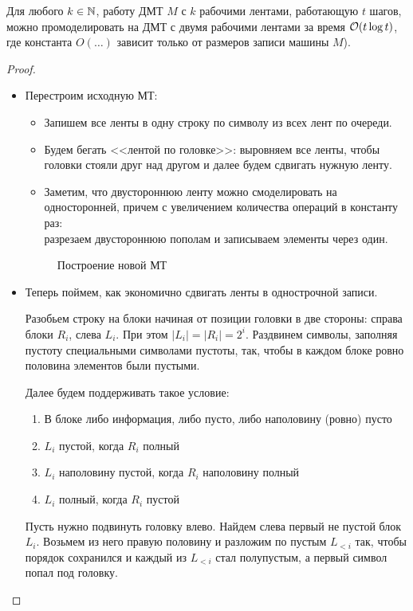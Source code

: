 \begin{thm}\label{th:two_bands}
	Для любого $ k \in \mathbb{N}$, работу ДМТ  $ M$ с $ k$ рабочими лентами, работающую $ t$ шагов, можно  промоделировать на  ДМТ с двумя рабочими лентами за время  $ \mathcal{O}(t \log t)$,
	где константа $ O(\ldots ) $ зависит только от размеров записи машины $ M$).
\end{thm}
\begin{proof}
	\begin{itemize}
		\item
			Перестроим исходную МТ:
			\begin{itemize}
				\item Запишем все ленты в одну строку  по символу из всех лент по очереди.
				\item  Будем бегать <<лентой по головке>>: выровняем все ленты, чтобы головки стояли друг над  другом и далее будем сдвигать нужную ленту.
				\item Заметим, что двустороннюю ленту можно смоделировать на односторонней, причем
				с увеличением количества операций в константу раз: \\
				разрезаем двустороннюю пополам и записываем элементы через один.
			\end{itemize}
			\begin{figure}[ht]
				\centering
				\caption{Построение новой МТ}
				\label{fig:two-bands}
			\end{figure}
		\item
			Теперь поймем, как экономично сдвигать ленты в однострочной записи.

			Разобьем строку на блоки начиная от позиции головки в две стороны: справа блоки $ R_i$, слева $ L_i$. При этом $ \lvert L_i \rvert = \lvert R_i \rvert  = 2^{i}$. Раздвинем символы, заполняя пустоту специальными символами пустоты, так, чтобы в каждом блоке ровно половина элементов были пустыми.

			Далее будем поддерживать такое условие:
			\begin{enumerate}[noitemsep]
				\item В блоке либо информация, либо пусто, либо наполовину (ровно) пусто
				\item $ L_i$ пустой, когда  $ R_i$ полный
				\item  $ L_i$ наполовину пустой, когда $ R_i$ наполовину полный
				\item $ L_i$ полный, когда $ R_i$ пустой
			\end{enumerate}

			Пусть нужно подвинуть головку влево. Найдем слева первый не пустой блок $ L_i$. Возьмем из него правую половину и разложим по пустым $ L_{<i}$ так, чтобы порядок сохранился и каждый из $ L_{<i}$ стал полупустым, а первый символ попал под головку.


\end{itemize}
\end{proof}
